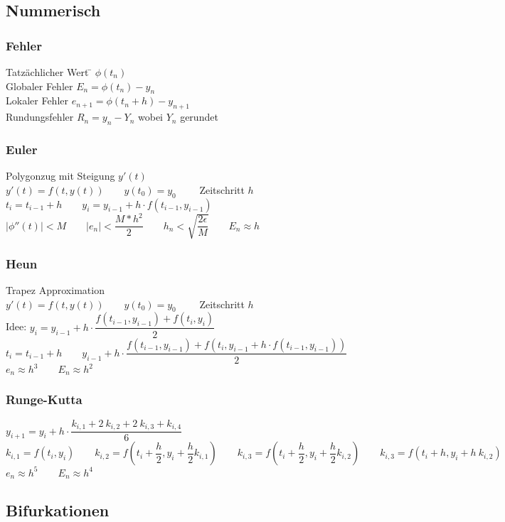 \subsection{Nummerisch}
\subsubsection{Fehler}

\begin{tabbing}
Tatzächlicher Wert  \= $\phi(t_n)$ \\
Globaler Fehler \> $E_n = \phi(t_n) - y_n$ \\
Lokaler Fehler \> $e_{n+1} = \phi(t_n + h) - y_{n+1}$ \\
Rundungsfehler \> $R_n = y_n - Y_n$ wobei $Y_n$ gerundet
\end{tabbing}

\subsubsection{Euler}
Polygonzug mit Steigung $y'(t)$\\
$y'(t)=f(t,y(t)) \qquad y(t_0)=y_0 \qquad$ Zeitschritt $h$\\
$t_i = t_{i-1} + h \qquad y_i=y_{i-1} + h \cdot f(t_{i-1},y_{i-1})$\\

$|\phi''(t)|<M \qquad |e_n| < \dfrac{M*h^2}{2} \qquad
h_n < \sqrt{\dfrac{2\epsilon}{M}} \qquad E_n \approx h$
\subsubsection{Heun}
Trapez Approximation\\
$y'(t)=f(t,y(t)) \qquad y(t_0)=y_0 \qquad$ Zeitschritt $h$\\
Idee: $y_i=y_{i-1} + h \cdot \dfrac{f(t_{i-1},y_{i-1}) + f(t_{i},y_{i})}{2}$\\
$t_i = t_{i-1} + h \qquad y_{i-1} + h \cdot \dfrac{f(t_{i-1},y_{i-1}) + f(t_{i},y_{i-1} + h \cdot f(t_{i-1},y_{i-1}))}{2}$\\
$e_n \approx h^3 \qquad E_n \approx h^2$
\subsubsection{Runge-Kutta}
$y_{i+1}=y_i + h \cdot \dfrac{k_{i,1} + 2\:k_{i,2} + 2\:k_{i,3} + k_{i,4} }{6}$\\
$k_{i,1} = f(t_{i},y_{i}) \qquad 
k_{i,2} = f(t_{i} + \dfrac{h}{2},y_{i} + \dfrac{h}{2}k_{i,1}) \qquad 
k_{i,3} = f(t_{i} + \dfrac{h}{2},y_{i} + \dfrac{h}{2}k_{i,2}) \qquad 
k_{i,3} = f(t_{i} + h,y_{i} + h \: k_{i,2}) \qquad$\\
$e_n \approx h^5 \qquad E_n \approx h^4$
\subsection{Bifurkationen}
